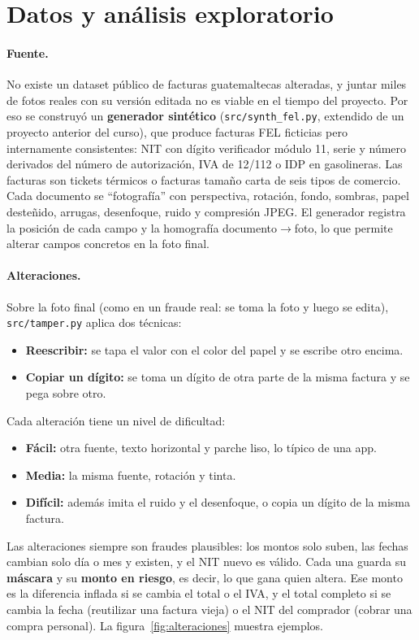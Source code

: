 \documentclass[11pt,letterpaper]{article}
\begin{document}
\section{Datos y análisis exploratorio}
\label{sec:datos}

\paragraph{Fuente.} No existe un dataset público de facturas guatemaltecas alteradas, y juntar miles de fotos reales con su versión editada no es viable en el tiempo del proyecto. Por eso se construyó un \textbf{generador sintético} (\texttt{src/synth\_fel.py}, extendido de un proyecto anterior del curso), que produce facturas FEL ficticias pero internamente consistentes: NIT con dígito verificador módulo 11, serie y número derivados del número de autorización, IVA de 12/112 o IDP en gasolineras. Las facturas son tickets térmicos o facturas tamaño carta de seis tipos de comercio. Cada documento se ``fotografía'' con perspectiva, rotación, fondo, sombras, papel desteñido, arrugas, desenfoque, ruido y compresión JPEG. El generador registra la posición de cada campo y la homografía documento$\to$foto, lo que permite alterar campos concretos en la foto final.

\paragraph{Alteraciones.} Sobre la foto final (como en un fraude real: se toma la foto y luego se edita), \texttt{src/tamper.py} aplica dos técnicas:
\begin{itemize}
  \item \textbf{Reescribir:} se tapa el valor con el color del papel y se escribe otro encima.
  \item \textbf{Copiar un dígito:} se toma un dígito de otra parte de la misma factura y se pega sobre otro.
\end{itemize}
Cada alteración tiene un nivel de dificultad:
\begin{itemize}
  \item \textbf{Fácil:} otra fuente, texto horizontal y parche liso, lo típico de una app.
  \item \textbf{Media:} la misma fuente, rotación y tinta.
  \item \textbf{Difícil:} además imita el ruido y el desenfoque, o copia un dígito de la misma factura.
\end{itemize}
Las alteraciones siempre son fraudes plausibles: los montos solo suben, las fechas cambian solo día o mes y existen, y el NIT nuevo es válido. Cada una guarda su \textbf{máscara} y su \textbf{monto en riesgo}, es decir, lo que gana quien altera. Ese monto es la diferencia inflada si se cambia el total o el IVA, y el total completo si se cambia la fecha (reutilizar una factura vieja) o el NIT del comprador (cobrar una compra personal). La figura~\ref{fig:alteraciones} muestra ejemplos.
\end{document}
